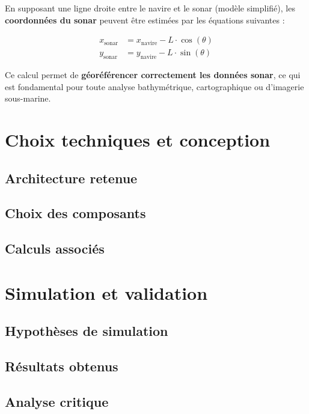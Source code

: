 \documentclass[12pt,a4paper]{report}
\begin{document}
En supposant une ligne droite entre le navire et le sonar (modèle simplifié), les \textbf{coordonnées du sonar} peuvent être estimées par les équations suivantes :

\begin{align*}
x_{\text{sonar}} &= x_{\text{navire}} - L \cdot \cos(\theta) \\
y_{\text{sonar}} &= y_{\text{navire}} - L \cdot \sin(\theta)
\end{align*}


Ce calcul permet de \textbf{géoréférencer correctement les données sonar}, ce qui est fondamental pour toute analyse bathymétrique, cartographique ou d'imagerie sous-marine.


\section{Choix techniques et conception}

\subsection{Architecture retenue}
\subsection{Choix des composants}
\subsection{Calculs associés}





\section{Simulation et validation}

\subsection{Hypothèses de simulation}
\subsection{Résultats obtenus}
\subsection{Analyse critique}
\end{document}
